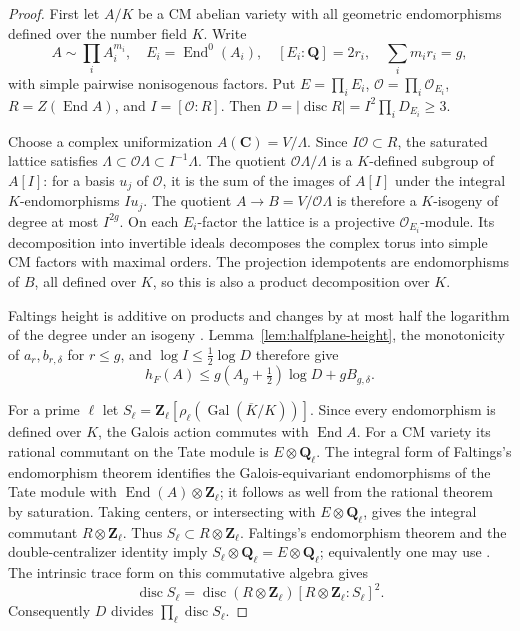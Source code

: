 \documentclass[11pt]{article}
\theoremstyle{definition}
\theoremstyle{remark}
\newcommand{\Q}{\mathbf Q}
\newcommand{\Z}{\mathbf Z}
\newcommand{\C}{\mathbf C}
\newcommand{\Gal}{\operatorname{Gal}}
\begin{document}
\begin{proof}
First let $A/K$ be a CM abelian variety with all geometric
endomorphisms defined over the number field $K$.  Write
\[
 A\sim\prod_i A_i^{m_i},\quad
 E_i=\operatorname{End}^0(A_i),\quad [E_i:\Q]=2r_i,
 \quad\sum_i m_ir_i=g,
\]
with simple pairwise nonisogenous factors.  Put
$E=\prod_i E_i$, $\mathcal O=\prod_i\mathcal O_{E_i}$,
$R=Z(\operatorname{End}A)$, and $I=[\mathcal O:R]$.
Then $D=|\operatorname{disc}R|=I^2\prod_iD_{E_i}\geq3$.

Choose a complex uniformization $A(\C)=V/\Lambda$.
Since $I\mathcal O\subset R$, the saturated lattice satisfies
$\Lambda\subset\mathcal O\Lambda\subset I^{-1}\Lambda$.
The quotient $\mathcal O\Lambda/\Lambda$ is a $K$-defined
subgroup of $A[I]$: for a basis $u_j$ of $\mathcal O$, it
is the sum of the images of $A[I]$ under the integral
$K$-endomorphisms $Iu_j$.
The quotient $A\to B=V/\mathcal O\Lambda$ is therefore a
$K$-isogeny of degree at most $I^{2g}$.
On each $E_i$-factor the lattice is a projective
$\mathcal O_{E_i}$-module.  Its decomposition into invertible
ideals decomposes the complex torus into simple CM factors
with maximal orders.  The projection idempotents are
endomorphisms of $B$, all defined over $K$, so this is also a
product decomposition over $K$.

Faltings height is additive on products and changes by at most
half the logarithm of the degree under an isogeny
\cite[\S2.3]{GR14}.  Lemma~\ref{lem:halfplane-height}, the
monotonicity of $a_r,b_{r,\delta}$ for $r\leq g$, and
$\log I\leq\tfrac12\log D$ therefore give
\begin{equation}\label{eq:order-height}
 h_F(A)\leq g(A_g+\tfrac12)\log D+gB_{g,\delta}.
\end{equation}

For a prime $\ell$ let
$S_\ell=\Z_\ell[\rho_\ell(\Gal(\overline K/K))]$.
Since every endomorphism is defined over $K$, the Galois
action commutes with $\operatorname{End}A$.  For a CM variety
its rational commutant on the Tate module is $E\otimes\Q_\ell$.
The integral form of Faltings's endomorphism theorem identifies
the Galois-equivariant endomorphisms of the Tate module with
$\operatorname{End}(A)\otimes\Z_\ell$; it follows as well from
the rational theorem by saturation.  Taking centers, or
intersecting with $E\otimes\Q_\ell$, gives the integral
commutant $R\otimes\Z_\ell$.  Thus
$S_\ell\subset R\otimes\Z_\ell$.
Faltings's endomorphism theorem and the double-centralizer
identity imply $S_\ell\otimes\Q_\ell=E\otimes\Q_\ell$;
equivalently one may use \cite[Proposition~13.7]{GR23}.
The intrinsic trace form on this commutative algebra gives
\[
 \operatorname{disc}S_\ell
  =\operatorname{disc}(R\otimes\Z_\ell)
          [R\otimes\Z_\ell:S_\ell]^2.
\]
Consequently $D$ divides $\prod_\ell\operatorname{disc}S_\ell$.


\end{proof}
\end{document}
